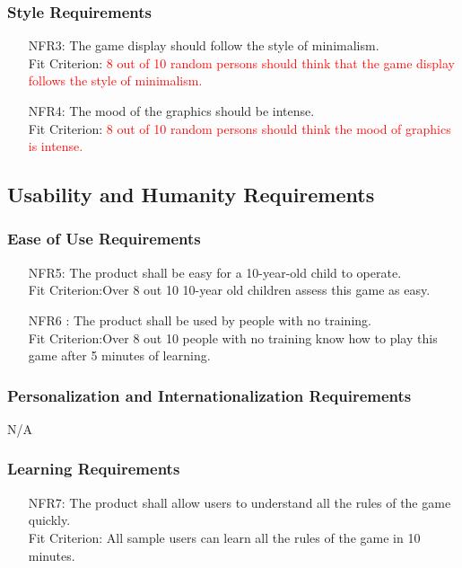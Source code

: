 \documentclass[12pt]{article}
\begin{document}
\subsubsection{Style Requirements}
\begin{itemize}
\item[NFR3:] The game display should follow the style of minimalism.\\ Fit Criterion:
\textcolor{red}{8 out of 10 random persons should think that the game display follows
the style of minimalism.}
\item[NFR4:] The mood of the graphics should be intense.\\Fit Criterion:
\textcolor{red}{8 out of 10 random persons should think the mood of graphics is intense.}
\end{itemize}
\subsection{Usability and Humanity Requirements}
\subsubsection{Ease of Use Requirements}
\begin{itemize}
\item[NFR5:]The product shall be easy for a 10-year-old child to operate.\\
Fit Criterion:Over 8 out 10 10-year old children assess this game as easy.
\item[NFR6]: The product shall be used by people with no training.\\
Fit Criterion:Over 8 out 10 people with no training know how to play this game after 5 minutes of learning.
\end{itemize}
\subsubsection{Personalization and Internationalization Requirements}
N/A
\subsubsection{Learning Requirements}
\begin{itemize}
\item[NFR7:] The product shall allow users to understand all the rules of the game quickly.\\
Fit Criterion: All sample users can learn all the rules of the game in 10 minutes.
\end{itemize}
\end{document}
